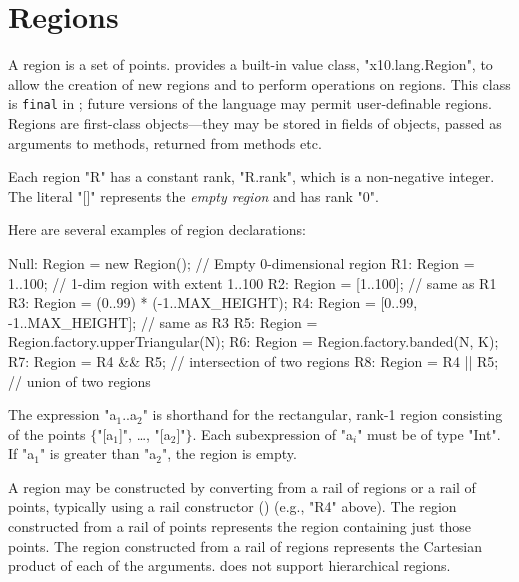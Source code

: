 \section{Regions}\label{XtenRegions}

A region is a set of points.  {}\Xten{}
provides a built-in value class, \xcd"x10.lang.Region", to allow the
creation of new regions and to perform operations on regions. This
class is {\tt final} in {}\XtenCurrVer; future versions of the
language may permit user-definable regions.
Regions are first-class
objects---they may be stored in fields of objects, passed as
arguments to methods, returned from methods etc.



Each region \xcd"R" has a constant rank, \xcd"R.rank", which is a
non-negative integer. The literal \xcd"[]" represents the {\em empty
region} and has rank \xcd"0".

Here are several examples of region declarations:
\begin{xten}
Null: Region = new Region();  // Empty 0-dimensional region          
R1: Region = 1..100; // 1-dim region with extent 1..100
R2: Region = [1..100]; // same as R1
R3: Region = (0..99) * (-1..MAX_HEIGHT);   
R4: Region = [0..99, -1..MAX_HEIGHT]; // same as R3  
R5: Region = Region.factory.upperTriangular(N);
R6: Region = Region.factory.banded(N, K);
R7: Region = R4 && R5; // intersection of two regions
R8: Region = R4 || R5; // union of two regions
\end{xten}

The expression \xcdmath"a$_1$..a$_2$"
is shorthand for the rectangular, rank-1 region
consisting of the points
$\{$\xcdmath"[a$_1$]", \dots, \xcdmath"[a$_2$]"$\}$.
Each subexpression of \xcdmath"a$_i$" must be of type \xcd"Int".
If \xcdmath"a$_1$"
is greater than \xcdmath"a$_2$", the region is empty.

A region may be constructed by converting from a rail of
regions or a rail of points, typically using a rail constructor
()
(e.g., \xcd"R4" above).
The region constructed from a rail of points represents the
region containing just those points.
The region constructed from a rail of regions
represents
the Cartesian product of each of the arguments.
\XtenCurrVer{} does not support hierarchical regions.


